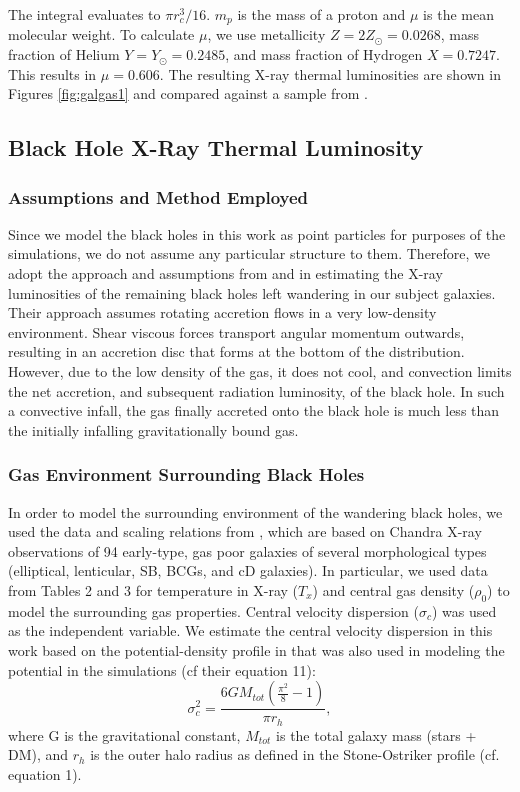 \documentclass[fleqn,usenatbib,useAMS]{mnras}
\begin{document}
The integral evaluates to ${\pi}r_c^3/16$.  $m_p$ is the mass of a proton and $\mu$ is the mean molecular weight.  To calculate $\mu$, we use metallicity $Z=2Z_{\odot}=0.0268$, mass fraction of Helium $Y=Y_{\odot}=0.2485$, and mass fraction of Hydrogen $X=0.7247$.  This results in $\mu=0.606$. The resulting X-ray thermal luminosities are shown in Figures \ref{fig:galgas1} and compared against a sample from \citet{2018ApJ...857...32B}.

\subsection{Black Hole X-Ray Thermal Luminosity}
\subsubsection{Assumptions and Method Employed}
Since we model the black holes in this work as point particles for purposes of the simulations, we do not assume any particular structure to them.  Therefore, we adopt the approach and assumptions from \citealt{2018MNRAS.476.1412I} and \citealt{2019MNRAS.486.5377I} in estimating the X-ray luminosities of the remaining black holes left wandering in our subject galaxies.  Their approach assumes rotating accretion flows in a very low-density environment.  Shear viscous forces transport angular momentum outwards, resulting in an accretion disc that forms at the bottom of the distribution.  However, due to the low density of the gas, it does not cool, and convection limits the net accretion, and subsequent radiation luminosity, of the black hole.  In such a convective infall, the gas finally accreted onto the black hole is much less than the initially infalling gravitationally bound gas.

\subsubsection{Gas Environment Surrounding Black Holes}
In order to model the surrounding environment of the wandering black holes, we used the data and scaling relations from \citet{2018ApJ...857...32B}, which are based on Chandra X-ray observations of 94 early-type, gas poor galaxies of several morphological types (elliptical, lenticular, SB, BCGs, and cD galaxies).  In particular, we used data from Tables 2 and 3 for temperature in X-ray ($T_x$) and central gas density ($\rho_0$) to model the surrounding gas properties.  Central velocity dispersion ($\sigma_c$) was used as the independent variable.  We estimate the central velocity dispersion in this work based on the potential-density profile in  \citet{2015ApJ...806L..28S} that was also used in modeling the potential in the simulations (cf their equation 11):
\begin{equation}
    \sigma_c^2 = \frac{6GM_{tot}(\frac{\pi^2}{8}-1)}{{\pi}r_h},
\end{equation}
where G is the gravitational constant, $M_{tot}$ is the total galaxy mass (stars + DM), and $r_h$ is the outer halo radius as defined in the Stone-Ostriker profile (cf. equation 1).
\end{document}
